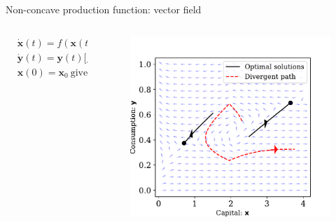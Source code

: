 \documentclass[aspectratio=169,10pt]{beamer}
\begin{document}
\begin{frame}{Non-concave production function: vector field}
	\begin{columns}
		\begin{column}{0.5\textwidth}
			\begin{align*}
				&\dot{\mathbf{x}}(t) = f(\mathbf{x}(t)) - \mathbf{y}(t)-\delta \mathbf{x}(t)\\
				&\dot{\mathbf{y}}(t) = \mathbf{y}(t)\big[f'(\mathbf{x}(t)) -\delta -r\big]\\
				& \mathbf{x}(0) = \mathbf{x}_0 ~ \text{given}.
			\end{align*}
		\end{column}
		\begin{column}{0.5\textwidth}
			\begin{figure}[t!]
				\centering
				\includegraphics[width=\textwidth]{figs/vec_field_con_con.pdf}
				\vspace{-4mm}
			\end{figure}
		\end{column}
	\end{columns}
\end{frame}
\end{document}
